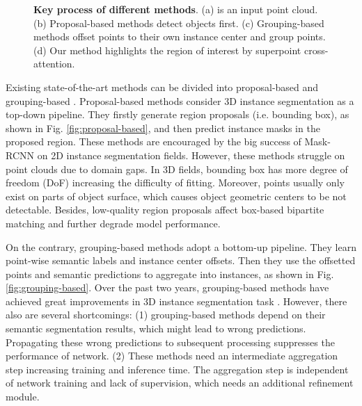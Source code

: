 \documentclass[letterpaper]{article} \usepackage{aaai23}  \usepackage{times}  \usepackage{helvet}  \usepackage{courier}  \usepackage[hyphens]{url}  \usepackage{graphicx} \urlstyle{rm} \def\UrlFont{\rm}  \usepackage{natbib}  \usepackage{caption} \frenchspacing  \setlength{\pdfpagewidth}{8.5in}  \setlength{\pdfpageheight}{11in}  \usepackage{algorithm}
\begin{document}
\begin{figure}[t]
\centering
{}
\quad
{}

\quad
{}
\caption{\textbf{Key process of different methods}. (a) is an input point cloud. (b) Proposal-based methods detect objects first. (c) Grouping-based methods offset points to their own instance center and group points. (d) Our method highlights the region of interest by superpoint cross-attention.}
\end{figure}

Existing state-of-the-art methods can be divided into proposal-based \cite{3dbonet, gicn} and grouping-based \cite{pointgroup, hais, sstnet, softgroup}. Proposal-based methods consider 3D instance segmentation as a top-down pipeline. They firstly generate region proposals (i.e. bounding box), as shown in Fig. \ref{fig:proposal-based}, and then predict instance masks in the proposed region. These methods are encouraged by the big success of Mask-RCNN \cite{mask_rcnn} on 2D instance segmentation fields. However, these methods struggle on point clouds due to domain gaps. In 3D fields, bounding box has more degree of freedom (DoF) increasing the difficulty of fitting. Moreover, points usually only exist on parts of object surface, which causes object geometric centers to be not detectable. Besides, low-quality region proposals affect box-based bipartite matching \cite{3dbonet} and further degrade model performance. 

On the contrary, grouping-based methods adopt a bottom-up pipeline. They learn point-wise semantic labels and instance center offsets. Then they use the offsetted points and semantic predictions to aggregate into instances, as shown in Fig. \ref{fig:grouping-based}. Over the past two years, grouping-based methods have achieved great improvements in 3D instance segmentation task \cite{sstnet, softgroup}. However, there also are several shortcomings: (1) grouping-based methods depend on their semantic segmentation results, which might lead to wrong predictions. Propagating these wrong predictions to subsequent processing suppresses the performance of network. (2) These methods need an intermediate aggregation step increasing training and inference time. The aggregation step is independent of network training and lack of supervision, which needs an additional refinement module.
\end{document}
